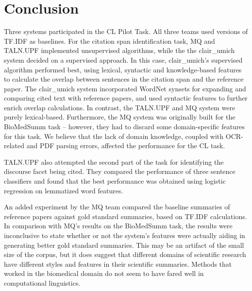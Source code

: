 \documentclass[11pt]{article}
\begin{document}
\section{Conclusion}
Three systems participated in the CL Pilot Task. All three teams used versions of TF.IDF as baselines.
For the citation span identification task, MQ and TALN.UPF implemented unsupervised algorithms, while the the clair\_umich system decided on a supervised approach. In this case, clair\_umich's supervised algorithm performed best, using lexical, syntactic and knowledge-based
features to calculate the overlap between sentences in the citation
span and the reference paper.
The clair\_umich system incorporated WordNet synsets for expanding and 
comparing cited text with reference papers, and used syntactic features 
to further enrich overlap calculations. In contrast, the TALN.UPF and MQ system were purely lexical-based. Furthermore, the MQ system was originally built for the
BioMedSumm task -- however, they had to discard some domain-specific
features for this task. We believe that the lack of domain knowledge,
coupled with OCR-related and PDF parsing errors, affected the
performance for the CL task. 

TALN.UPF also attempted the second part of the task for identifying the discourse facet being cited. They compared the performance of three sentence classifiers and found that the best performance was obtained using logistic regression on lemmatized word features.

An added experiment by the MQ
team compared the baseline summaries of reference papers against gold
standard summaries, based on TF.IDF calculations. In comparison with MQ's results 
on the BioMedSumm task, the results were inconclusive to state whether or not the system's features
were actually aiding in generating better gold standard summaries. This may be an artifact of the 
small size of the corpus, but it does suggest that different domains of scientific research have
different styles and features in their scientific summaries. Methods that worked in the biomedical domain
do not seem to have fared well in computational linguistics.
\end{document}
